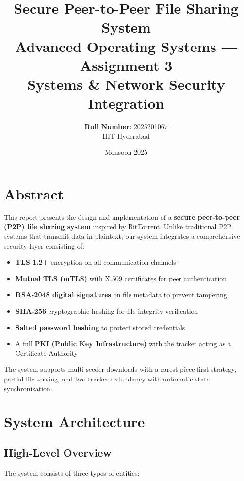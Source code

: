\documentclass[12pt,a4paper]{article}
\title{
    \vspace{-1cm}
    \textbf{Secure Peer-to-Peer File Sharing System} \\
    \large Advanced Operating Systems --- Assignment 3 \\
    \large Systems \& Network Security Integration
}
\author{
    \textbf{Roll Number:} 2025201067 \\
    IIIT Hyderabad
}
\date{Monsoon 2025}
\begin{document}
\maketitle
\tableofcontents
\newpage

\section{Abstract}

This report presents the design and implementation of a \textbf{secure peer-to-peer (P2P) file sharing system} inspired by BitTorrent. Unlike traditional P2P systems that transmit data in plaintext, our system integrates a comprehensive security layer consisting of:

\begin{itemize}
    \item \textbf{TLS 1.2+} encryption on all communication channels
    \item \textbf{Mutual TLS (mTLS)} with X.509 certificates for peer authentication
    \item \textbf{RSA-2048 digital signatures} on file metadata to prevent tampering
    \item \textbf{SHA-256} cryptographic hashing for file integrity verification
    \item \textbf{Salted password hashing} to protect stored credentials
    \item A full \textbf{PKI (Public Key Infrastructure)} with the tracker acting as a Certificate Authority
\end{itemize}

The system supports multi-seeder downloads with a rarest-piece-first strategy, partial file serving, and two-tracker redundancy with automatic state synchronization.

\section{System Architecture}

\subsection{High-Level Overview}

The system consists of three types of entities:
\end{document}
